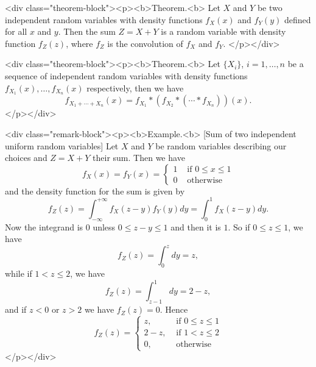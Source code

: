<div class="theorem-block"><p><b>Theorem.<b> 
Let $X$ and $Y$ be two independent random variables with density functions $f_X(x)$ and $f_Y(y)$ defined for all $x$ and $y$. Then the sum $Z = X + Y$ is a random variable with density function $f_Z(z)$, where $f_Z$ is the convolution of $f_X$ and $f_Y$.
</p></div>

<div class="theorem-block"><p><b>Theorem.<b> 
Let $\{X_i\}$, $i=1,\dots, n$ be a sequence of independent random variables with density functions $f_{X_1}(x), \dots, f_{X_n}(x)$ respectively, then we have 
$$\begin{equation}
    f_{X_1 + \cdots + X_n}(x) = f_{X_1} * \left( f_{X_2} * ( \cdots * f_{X_n}) \right)(x).
\end{equation}$$
</p></div>

<div class="remark-block"><p><b>Example.<b> [Sum of two independent uniform random variables]
Let $X$ and $Y$ be random variables describing our choices and $Z = X + Y$ their sum. Then we have
$$\begin{equation}
    f_{X}(x)=f_{Y}(x)=\left\{\begin{array}{ll}{1} & {\text { if } 0 \leq x \leq 1} \\ {0} & {\text { otherwise }}\end{array}\right.
\end{equation}$$
and the density function for the sum is given by
$$\begin{equation}
    f_{Z}(z)=\int_{-\infty}^{+\infty} f_{X}(z-y) f_{Y}(y) d y = \int_{0}^{1} f_{X}(z-y) d y.
\end{equation}$$
Now the integrand is $0$ unless $0 \leq z-y \leq 1$ and then it is $1$. So if $0 \leq z \leq 1$, we have 
$$\begin{equation}
    f_{Z}(z)=\int_{0}^{z} d y=z,
\end{equation}$$
while if $1 < z \leq 2$, we have
$$\begin{equation}
    f_{Z}(z)=\int_{z-1}^{1} d y=2-z, 
\end{equation}$$
and if $z < 0$ or $z > 2$ we have $f_Z(z) = 0$. Hence
$$\begin{equation}
    f_{Z}(z)=\left\{\begin{array}{ll}{z,} & {\text { if } 0 \leq z \leq 1} \\ {2-z,} & {\text { if } 1<z \leq 2} \\ {0,} & {\text { otherwise }}\end{array}\right.
\end{equation}$$
</p></div>

